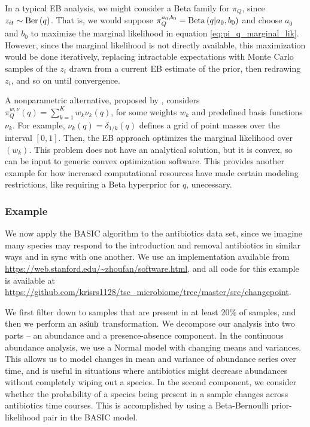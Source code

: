 \documentclass[14pt]{extarticle}
\begin{document}
In a typical EB analysis, we might consider a Beta family for $\pi_{Q}$, since
$z_{it} \sim \textnormal{Ber}\left(q\right)$. That is, we would suppose $\pi_{Q}^{a_0, b_0}
= \textnormal{Beta}\left(q \vert a_{0}, b_{0}\right)$ and choose $a_{0}$ and $b_0$ to
maximize the marginal likelihood in equation \ref{eq:pi_q_marginal_lik}.
However, since the marginal likelihood is not directly available, this
maximization would be done iteratively, replacing intractable expectations with
Monte Carlo samples of the $z_i$ drawn from a current EB estimate of the prior,
then redrawing $z_i$, and so on until convergence.

A nonparametric alternative, proposed by \citep{fan2015empirical}, considers
$\pi_{Q}^{w, \nu}\left(q\right) = \sum_{k = 1}^{K} w_{k} \nu_{k}\left(q\right)$,
for some weights $w_{k}$ and predefined basis functions $\nu_{k}$. For example,
$\nu_{k}\left(q\right) = \delta_{1 / k}\left(q\right)$ defines a grid of point
masses over the interval $\left[0, 1\right]$. Then, the EB approach optimizes
the marginal likelihood over $\left(w_k\right)$. This problem does not have an
analytical solution, but it is convex, so can be input to generic convex
optimization software. This provides another example for how increased
computational resources have made certain modeling restrictions, like requiring
a Beta hyperprior for $q$, unecessary.


\subsubsection{Example}
\label{subsec:basic_example}

We now apply the BASIC algorithm to the antibiotics data set, since we imagine
many species may respond to the introduction and removal antibiotics in similar
ways and in sync with one another. We use an implementation available from
\url{https://web.stanford.edu/~zhoufan/software.html}, and all code for this
example is available at
\url{https://github.com/krisrs1128/tsc_microbiome/tree/master/src/changepoint}.

We first filter down to samples that are present in at least 20\% of samples,
and then we perform an $\mathop\mathrm{asinh}$ transformation. We decompose our analysis into
two parts -- an abundance and a presence-absence component. In the continuous
abundance analysis, we use a Normal model with changing means and variances.
This allows us to model changes in mean and variance of abundance series over
time, and is useful in situations where antibiotics might decrease abundances
without completely wiping out a species. In the second component, we consider
whether the probability of a species being present in a sample changes across
antibiotics time courses. This is accomplished by using a Beta-Bernoulli
prior-likelihood pair in the BASIC model.
\end{document}
